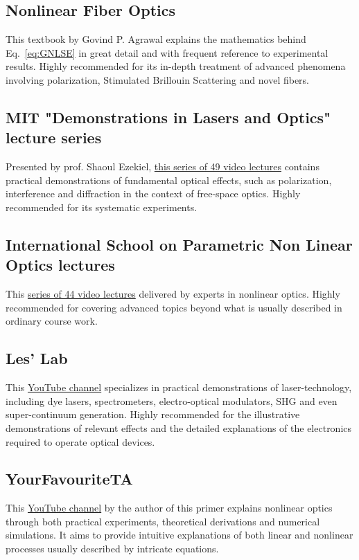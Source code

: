 \subsection*{Nonlinear Fiber Optics}
This textbook by Govind P. Agrawal explains the mathematics behind Eq.~\ref{eq:GNLSE} in great detail and with frequent reference to experimental results. Highly recommended for its in-depth treatment of advanced phenomena involving polarization, Stimulated Brillouin Scattering and novel fibers.

\subsection*{MIT "Demonstrations in Lasers and Optics" lecture series}
Presented by prof. Shaoul Ezekiel, \href{https://www.youtube.com/watch?v=1cEXNLP5uE0&list=PL4E7FAAD67B171EBC}{this series of 49 video lectures} contains practical demonstrations of fundamental optical effects, such as polarization, interference and diffraction in the context of free-space optics. Highly recommended for its systematic experiments.    

\subsection*{International School on Parametric Non Linear Optics lectures}
This \href{https://www.youtube.com/@ispnlo9041/videos}{series of 44 video lectures} delivered by experts in nonlinear optics. Highly recommended for covering advanced topics beyond what is usually described in ordinary course work.  

\subsection*{Les' Lab}
This \href{https://www.youtube.com/@LesLaboratory/videos}{YouTube channel} specializes in practical demonstrations of laser-technology, including dye lasers, spectrometers, electro-optical modulators, SHG and even super-continuum generation. Highly recommended for the illustrative demonstrations of relevant effects and the detailed explanations of the electronics required to operate optical devices.

\subsection*{YourFavouriteTA}
This \href{https://www.youtube.com/@yourfavouriteta/videos}{YouTube channel} by the author of this primer explains nonlinear optics through both practical experiments, theoretical derivations and numerical simulations. It aims to provide intuitive explanations of both linear and nonlinear processes usually described by intricate equations.  


